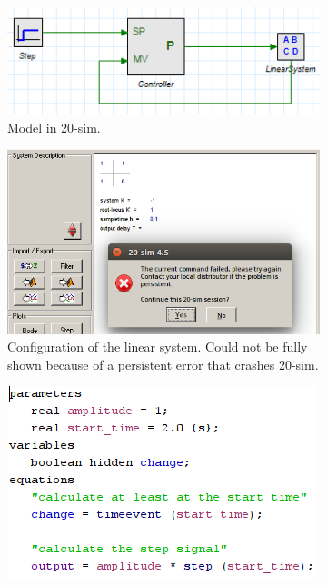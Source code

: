 \documentclass[a4paper,twoside,11pt]{article}
\begin{document}
\begin{figure}
	\centering
	\begin{subfigure}{0.5\textwidth}
	 \centering
	 \includegraphics[width=\textwidth]{./images/3_1-20sim-model.png}
	 \caption{Model in 20-sim.}
	 \label{fig:3_1-20sim-model:model}
	\end{subfigure}%
	\begin{subfigure}{0.5\textwidth}
	 \centering
	 \includegraphics[width=\textwidth]{./images/3_1-20sim-plant.png}
	 \caption{Configuration of the linear system. Could not be fully shown because of a persistent error that crashes 20-sim.}
	 \label{fig:3_1-20sim-model:plant}
	\end{subfigure}
	\begin{subfigure}{0.5\textwidth}
	 \centering
	 \includegraphics[width=\textwidth]{./images/3_1-20sim-model-stepfunction.png}

\end{subfigure}
\end{figure}
\end{document}
